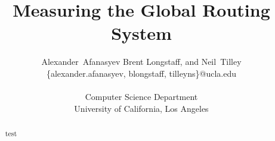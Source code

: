 \documentclass[conference]{IEEEtran}%
\title{Measuring the Global Routing System}
\author{Alexander~Afanasyev %
Brent Longstaff, and Neil~Tilley \\ %
\small \{alexander.afanasyev, blongstaff, tilleyns\}@ucla.edu \\ \\
\small Computer Science Department \\
\small University of California, Los Angeles 
}
\begin{document}
\maketitle

\begin{abstract}
	test
\end{abstract}











% 
% 



\end{document}
